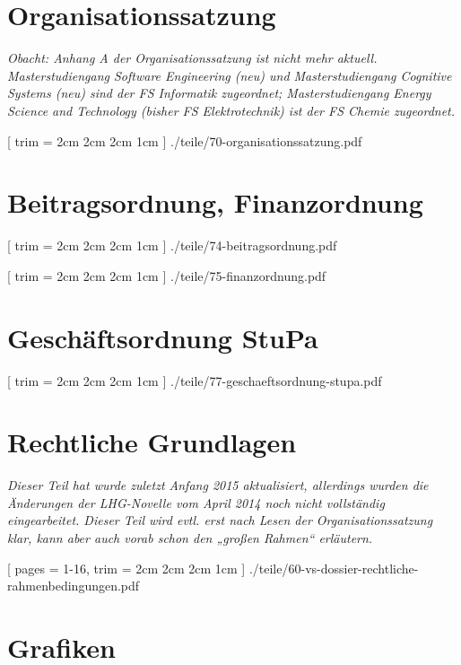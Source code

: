 \documentclass[
	10pt,
	a5paper,
	twoside
	]
	{book}
\begin{document}
\chapter{Organisationssatzung}

\textit{Obacht: Anhang A der Organisationssatzung ist nicht mehr aktuell. Masterstudiengang Software Engineering (neu) und Masterstudiengang Cognitive Systems (neu) sind der FS Informatik zugeordnet; Masterstudiengang Energy Science and Technology (bisher FS Elektrotechnik) ist der FS Chemie zugeordnet.}

\clearpage


	[
		trim = 2cm 2cm 2cm 1cm
	]
	{./teile/70-organisationssatzung.pdf}


\chapter{Beitragsordnung, Finanzordnung}


\clearpage


[
trim = 2cm 2cm 2cm 1cm
]
{./teile/74-beitragsordnung.pdf}


	[
		trim = 2cm 2cm 2cm 1cm
	]
	{./teile/75-finanzordnung.pdf}


\chapter{Geschäftsordnung StuPa}

\clearpage


[
trim = 2cm 2cm 2cm 1cm
]
{./teile/77-geschaeftsordnung-stupa.pdf}



\chapter{Rechtliche Grundlagen}

\textit{Dieser Teil hat wurde zuletzt Anfang 2015 aktualisiert, allerdings wurden die Änderungen der LHG-Novelle vom April 2014 noch nicht vollständig eingearbeitet. Dieser Teil wird evtl. erst nach Lesen der Organisationssatzung klar, kann aber auch vorab schon den „großen Rahmen“ erläutern.}

\clearpage


[
pages = 1-16,
trim = 2cm 2cm 2cm 1cm
]
{./teile/60-vs-dossier-rechtliche-rahmenbedingungen.pdf}



\chapter{Grafiken}
\end{document}
